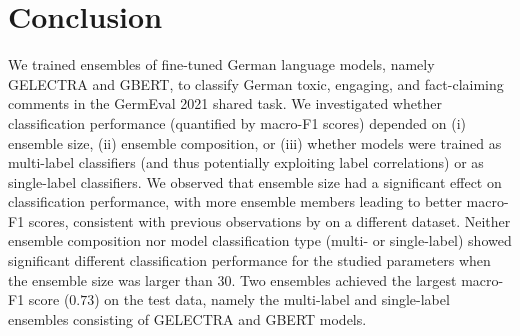 \documentclass[11pt,a4paper]{article}
\begin{document}
\section{Conclusion}
We trained ensembles of fine-tuned German language models, namely GELECTRA and GBERT, to classify German
toxic, engaging, and \mbox{fact-claiming} comments in the GermEval 2021 shared task. We investigated whether classification performance (quantified by macro-F1 scores) depended on (i) ensemble size, (ii) ensemble composition, or (iii) whether models were trained as multi-label classifiers (and thus potentially exploiting label correlations) or as single-label classifiers. We observed that ensemble size had a significant effect on classification performance, with more ensemble members leading to better macro-F1 scores, consistent with previous observations by \citet{Risch2020} on a different dataset. Neither ensemble composition nor model classification type (multi- or single-label) showed significant different classification performance for the studied parameters when the ensemble size was larger than 30. Two ensembles achieved the largest macro-F1 score ($0.73$) on the test data, namely the multi-label and single-label ensembles consisting of GELECTRA and GBERT models.
\end{document}
